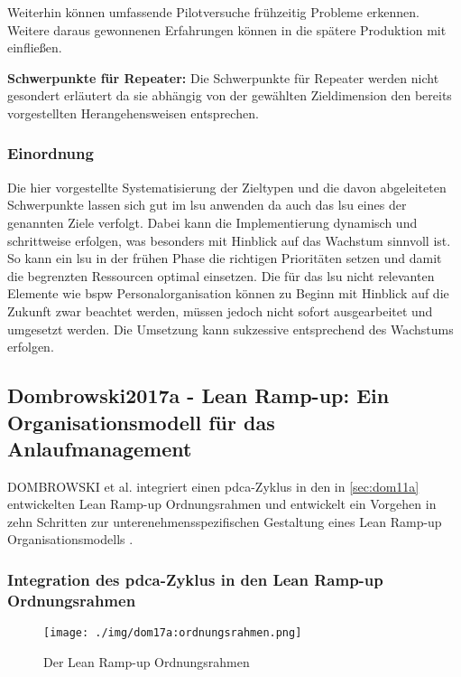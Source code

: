 Weiterhin können umfassende Pilotversuche frühzeitig Probleme erkennen. Weitere daraus gewonnenen Erfahrungen können in die spätere Produktion mit einfließen. 

\textbf{Schwerpunkte für Repeater:} Die Schwerpunkte für Repeater werden nicht gesondert erläutert da sie abhängig von der gewählten Zieldimension den bereits vorgestellten Herangehensweisen entsprechen. 
\subsubsection{Einordnung}
Die hier vorgestellte Systematisierung der Zieltypen und die davon abgeleiteten Schwerpunkte lassen sich gut im \gls{lsu} anwenden da auch das \gls{lsu} eines der genannten Ziele verfolgt. Dabei kann die Implementierung dynamisch und schrittweise erfolgen, was besonders mit Hinblick auf das Wachstum sinnvoll ist. So kann ein \gls{lsu} in der frühen Phase die richtigen Prioritäten setzen und damit die begrenzten Ressourcen optimal einsetzen. Die für das \gls{lsu} nicht relevanten Elemente wie \gls{bspw} Personalorganisation können zu Beginn mit Hinblick auf die Zukunft zwar beachtet werden, müssen jedoch nicht sofort ausgearbeitet und umgesetzt werden. Die Umsetzung kann sukzessive entsprechend des Wachstums erfolgen. 

\subsection*{Dombrowski2017a - Lean Ramp-up: Ein Organisationsmodell für das Anlaufmanagement}

DOMBROWSKI et al. integriert einen \gls{pdca}-Zyklus in den in \ref{sec:dom11a} entwickelten Lean Ramp-up Ordnungsrahmen und entwickelt ein Vorgehen in zehn Schritten zur unterenehmensspezifischen Gestaltung eines Lean Ramp-up Organisationsmodells \cite{Dombrowski2017a}. 

\subsubsection{Integration des \gls{pdca}-Zyklus in den Lean Ramp-up Ordnungsrahmen}
\begin{figure}[h]
 \centering
 \texttt{[image: ./img/dom17a:ordnungsrahmen.png]}
 \caption{Der Lean Ramp-up Ordnungsrahmen \cite{Dombrowski2017a}}
 \label{fig:dom17a:ordnungsrahmen}
\end{figure}

